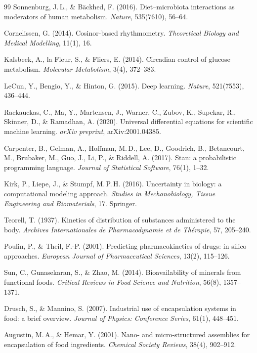 ﻿\documentclass[12pt,a4paper]{article}
\theoremstyle{plain}
\theoremstyle{definition}
\theoremstyle{remark}
\begin{document}
\begin{thebibliography}{99}
Sonnenburg, J.\,L., \& Bäckhed, F. (2016).
Diet--microbiota interactions as moderators of human metabolism.
\textit{Nature}, 535(7610), 56--64.

Cornelissen, G. (2014).
Cosinor-based rhythmometry.
\textit{Theoretical Biology and Medical Modelling}, 11(1), 16.

Kalsbeek, A., la Fleur, S., \& Fliers, E. (2014).
Circadian control of glucose metabolism.
\textit{Molecular Metabolism}, 3(4), 372--383.

LeCun, Y., Bengio, Y., \& Hinton, G. (2015).
Deep learning.
\textit{Nature}, 521(7553), 436--444.

Rackauckas, C., Ma, Y., Martensen, J., Warner, C., Zubov, K.,
Supekar, R., Skinner, D., \& Ramadhan, A. (2020).
Universal differential equations for scientific machine learning.
\textit{arXiv preprint}, arXiv:2001.04385.

Carpenter, B., Gelman, A., Hoffman, M.\,D., Lee, D., Goodrich, B.,
Betancourt, M., Brubaker, M., Guo, J., Li, P., \& Riddell, A. (2017).
Stan: a probabilistic programming language.
\textit{Journal of Statistical Software}, 76(1), 1--32.

Kirk, P., Liepe, J., \& Stumpf, M.\,P.\,H. (2016).
Uncertainty in biology: a computational modeling approach.
\textit{Studies in Mechanobiology, Tissue Engineering and Biomaterials}, 17.
Springer.

Teorell, T. (1937).
Kinetics of distribution of substances administered to the body.
\textit{Archives Internationales de Pharmacodynamie et de Thérapie},
57, 205--240.

Poulin, P., \& Theil, F.-P. (2001).
Predicting pharmacokinetics of drugs: in silico approaches.
\textit{European Journal of Pharmaceutical Sciences}, 13(2), 115--126.

Sun, C., Gunasekaran, S., \& Zhao, M. (2014).
Bioavailability of minerals from functional foods.
\textit{Critical Reviews in Food Science and Nutrition}, 56(8), 1357--1371.

Drusch, S., \& Mannino, S. (2007).
Industrial use of encapsulation systems in food: a brief overview.
\textit{Journal of Physics: Conference Series}, 61(1), 448--451.

Augustin, M.\,A., \& Hemar, Y. (2001).
Nano- and micro-structured assemblies for encapsulation of food ingredients.
\textit{Chemical Society Reviews}, 38(4), 902--912.


\end{thebibliography}
\end{document}
